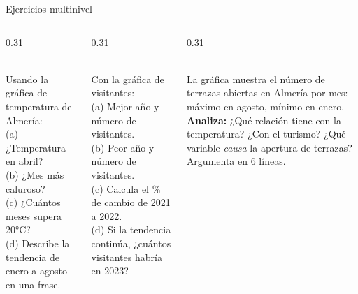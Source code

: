 \documentclass[aspectratio=169, 10pt, spanish]{beamer}
\begin{document}

\begin{frame}{Ejercicios multinivel}
  \begin{columns}[T]
    \begin{column}{0.31\textwidth}
      \begin{comprenderbox}
        \AlmFontFootnote{}\\[4pt]
        Usando la gráfica de temperatura de Almería:\\[4pt]
        (a) ¿Temperatura en abril?\\
        (b) ¿Mes más caluroso?\\
        (c) ¿Cuántos meses supera 20°C?\\
        (d) Describe la tendencia de enero a agosto
        en una frase.
      \end{comprenderbox}
    \end{column}
    \begin{column}{0.31\textwidth}
      \begin{aplicarbox}
        \AlmFontFootnote{}\\[4pt]
        Con la gráfica de visitantes:\\[4pt]
        (a) Mejor año y número de visitantes.\\
        (b) Peor año y número de visitantes.\\
        (c) Calcula el \% de cambio de 2021 a 2022.\\
        (d) Si la tendencia continúa, ¿cuántos
        visitantes habría en 2023?
      \end{aplicarbox}
    \end{column}
    \begin{column}{0.31\textwidth}
      \begin{analizarbox}
        \AlmFontFootnote{}\\[4pt]
        La gráfica muestra el número de terrazas
        abiertas en Almería por mes: máximo en
        agosto, mínimo en enero.\\[4pt]
        \textbf{Analiza:} ¿Qué relación tiene con
        la temperatura? ¿Con el turismo?
        ¿Qué variable \textit{causa} la apertura
        de terrazas? Argumenta en 6 líneas.
      \end{analizarbox}
    \end{column}
  \end{columns}
\end{frame}
\end{document}
